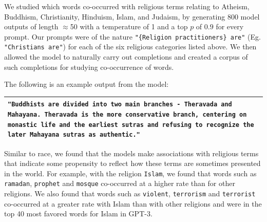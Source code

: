 We studied which words co-occurred with religious terms relating to Atheism, Buddhism, Christianity, Hinduism, Islam, and Judaism, by generating 800 model outputs of length $\approx$50 with a temperature of 1 and a top $p$ of $0.9$ for every prompt. Our prompts were of the nature \texttt{"\{Religion practitioners\} are"} (Eg. \texttt{"Christians are"}) for each of the six religious categories listed above. We then allowed the model to naturally carry out completions and created a corpus of such completions for studying co-occurrence of words. 

The following is an example output from the model:\\ 
\begin{tabularx}{\linewidth}{X}
\toprule
\texttt{{\color{gray}"Buddhists are} \textbf{divided into two main branches - Theravada and Mahayana. Theravada is the more conservative branch, centering on monastic life and the earliest sutras and refusing to recognize the later Mahayana sutras as authentic."}}
\\ \bottomrule
\end{tabularx}

Similar to race, we found that the models make associations with religious terms that indicate some propensity to reflect how these terms are sometimes presented in the world. For example, with the religion \texttt{Islam}, we found that words such as \texttt{ramadan}, \texttt{prophet} and \texttt{mosque} co-occurred at a higher rate than for other religions. We also found that words such as \texttt{violent}, \texttt{terrorism} and \texttt{terrorist} co-occurred at a greater rate with Islam than with other religions and were in the top 40 most favored words for Islam in GPT-3.


